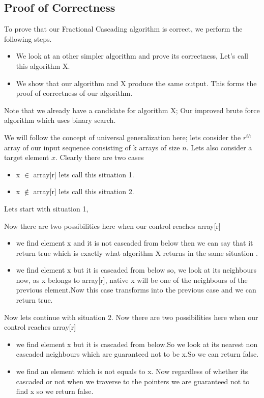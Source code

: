 \documentclass[11pt]{article}
\begin{document}
\pagebreak

\subsection{Proof of Correctness}
To prove that our Fractional Cascading algorithm is correct, we perform the following steps.
\begin{itemize}
    \item We look at an other simpler algorithm and prove its correctness, Let's call this algorithm X.
    \item We show that our algorithm and X produce the same output. This forms the proof of correctness of our algorithm.
\end{itemize}

Note that we already have a candidate for algorithm X; Our improved brute force algorithm which uses binary search.


We will follow the concept of universal generalization here; lets consider the $r^{th}$ array of our input sequence consisting of k arrays of size $n$. Lets also consider a target element $x$. Clearly there are two cases
\begin{itemize}
    \item x $\in$ array[r] lets call this situation 1.
     \item x $\notin$ array[r] lets call this situation 2.
\end{itemize}

Lets start with situation 1, 


Now there are two possibilities here when our control reaches array[r] 
\begin{itemize}
    \item we find element x and it is not cascaded from below then we can say that it return true which is exactly what algorithm X returns in the same situation .
    \item we find element x but it is cascaded from below so, we look at its neighbours now, as x belongs to array[r], native x will be one of the neighbours of the previous element.Now this case transforms into the previous case and we can return true.
\end{itemize}
Now lets continue with situation 2.
Now there are two possibilities here when our control reaches array[r] 

\begin{itemize}
    \item we find element x but it is cascaded from below.So we look at its nearest non cascaded neighbours which are guaranteed not to be x.So we can return false.
    \item we find an element which is not equals to x. Now  regardless of whether its cascaded or not when we traverse to the pointers we are guaranteed not to find x so we return false.
\end{itemize}
\end{document}
